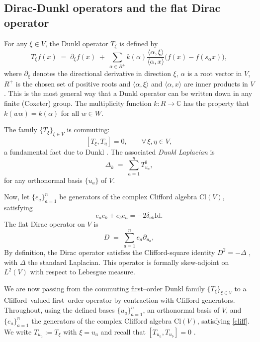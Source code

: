 \documentclass[12pt]{article}
\newcommand{\Cl}{\mathrm{Cl}}
\newcommand{\Id}{\mathrm{Id}}
\newcommand{\1}{\mathbbm{1}}
\theoremstyle{definition}
\begin{document}
\subsection{Dirac-Dunkl operators and the flat Dirac operator}
For any $\xi \in V$, the {Dunkl operator} $T_{\xi}$ is defined by
\begin{equation}\label{eq:Dunkl}
  T_{\xi} f(x) \;=\; \partial_{\xi} f(x) \;+\;
  \sum_{\alpha \in R^{+}}
  k(\alpha) \frac{\langle \alpha, \xi \rangle}{\langle \alpha, x \rangle}
  \Big( f(x) - f(s_{\alpha}x) \Big) ,
\end{equation}
where $\partial_{\xi}$ denotes the directional derivative in direction $\xi$, $\alpha$ is a root vector in $V$, $R^{+}$ is the chosen set of positive roots and $\langle \alpha, \xi \rangle$ and $\langle \alpha, x \rangle$ are inner products in $V$. This is the most general way that a Dunkl operator can be written down in any finite (Coxeter) group. 
The multiplicity function $k: R \to \mathbb{C}$ has the property that $k(w\alpha)=k(\alpha)$ for all $w\in W$.

The family $\{T_{\xi}\}_{\xi \in V}$ is commuting:
\begin{equation}\label{eq:commute}
  [T_{\xi}, T_{\eta}] = 0, \qquad \forall\, \xi, \eta \in V ,
\end{equation}
a fundamental fact due to Dunkl \cite{Dunkl1989}. The associated \emph{Dunkl Laplacian} is
\[
  \Delta_{k} \;=\; \sum_{a=1}^{n} T_{u_{a}}^{2},
\]
for any orthonormal basis $\{u_{a}\}$ of $V$.

Now, let $\{e_{a}\}_{a=1}^{n}$ be generators of the complex Clifford algebra $\Cl(V)$, satisfying
\begin{equation}\label{cliff}
  e_{a} e_{b} + e_{b} e_{a} = - 2 \delta_{ab}\Id .
\end{equation}
The flat Dirac operator on $V$ is
\begin{equation}\label{eq:DiracFlat}
  D \;=\; \sum_{a=1}^{n} e_{a} \partial_{u_{a}} ,
\end{equation}
By definition, the Dirac operator satisfies the Clifford-square identity $D^{2} = - \Delta$ ,
with $\Delta$ the standard Laplacian. This operator is formally skew-adjoint on
$L^{2}(V)$ with respect to Lebesgue measure.

We are now passing from the commuting first--order Dunkl family $\{T_{\xi}\}_{\xi\in V}$ to a Clifford--valued first--order operator by contraction with Clifford generators. Throughout,
using the defined bases $\{u_{a}\}_{a=1}^{n}$, an orthonormal basis of $V$, and 
$\{e_{a}\}_{a=1}^{n}$  the generators of the complex Clifford algebra $\Cl(V)$,
satisfying \eqref{cliff}. We write $T_{u_{a}} := T_{\xi}$ with $\xi=u_{a}$ and recall that
$[T_{u_{a}},T_{u_{b}}]=0$ \cite{Dunkl1989}.
\end{document}
